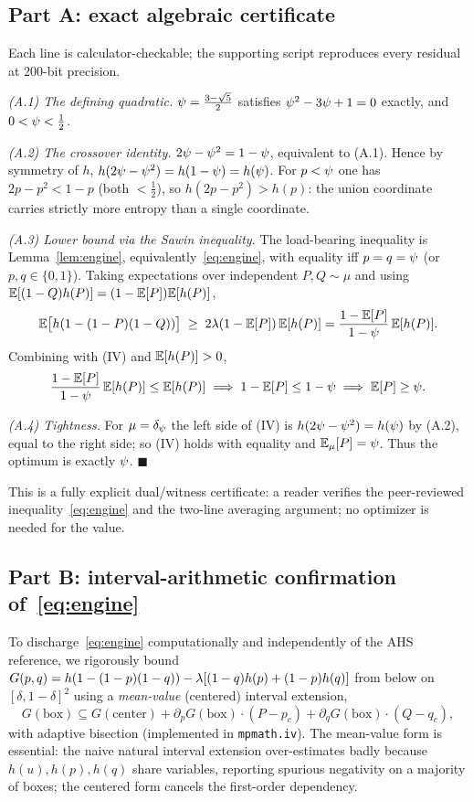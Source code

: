 \documentclass[11pt]{amsart}
\theoremstyle{definition}
\theoremstyle{remark}
\begin{document}
\subsection{Part A: exact algebraic certificate}
Each line is calculator-checkable; the supporting script reproduces every residual
at $200$-bit precision.

\emph{(A.1) The defining quadratic.} $\psi=\tfrac{3-\sqrt{5}}{2}$ satisfies
$\psi^2-3\psi+1=0$ exactly, and $0<\psi<\tfrac12$.

\emph{(A.2) The crossover identity.} $2\psi-\psi^2=1-\psi$, equivalent to
(A.1). Hence by symmetry of $h$,
$h(2\psi-\psi^2)=h(1-\psi)=h(\psi)$. For $p<\psi$ one has
$2p-p^2<1-p$ (both $<\tfrac12$), so $h(2p-p^2)>h(p)$: the union coordinate
carries strictly more entropy than a single coordinate.

\emph{(A.3) Lower bound via the Sawin inequality.} The load-bearing inequality is
Lemma~\ref{lem:engine}, equivalently~\eqref{eq:engine}, with equality iff
$p=q=\psi$ (or $p,q\in\{0,1\}$). Taking expectations over independent
$P,Q\sim\mu$ and using $\mathbb{E}[(1-Q)h(P)]=(1-\mathbb{E}[P])\mathbb{E}[h(P)]$,
\[
   \mathbb{E}\bigl[h(1-(1-P)(1-Q))\bigr]\;\ge\;2\lambda(1-\mathbb{E}[P])\,\mathbb{E}[h(P)]
   =\frac{1-\mathbb{E}[P]}{1-\psi}\,\mathbb{E}[h(P)] .
\]
Combining with (IV) and $\mathbb{E}[h(P)]>0$,
\[
   \frac{1-\mathbb{E}[P]}{1-\psi}\,\mathbb{E}[h(P)]\le\mathbb{E}[h(P)]
   \;\Longrightarrow\; 1-\mathbb{E}[P]\le 1-\psi
   \;\Longrightarrow\; \mathbb{E}[P]\ge\psi .
\]

\emph{(A.4) Tightness.} For $\mu=\delta_{\psi}$ the left side of (IV) is
$h(2\psi-\psi^2)=h(\psi)$ by (A.2), equal to the right side; so (IV) holds with
equality and $\mathbb{E}_\mu[P]=\psi$. Thus the optimum is exactly $\psi$.\qquad
$\blacksquare$

This is a fully explicit dual/witness certificate: a reader verifies the
peer-reviewed inequality~\eqref{eq:engine} and the two-line averaging argument; no
optimizer is needed for the value.

\subsection{Part B: interval-arithmetic confirmation of~\eqref{eq:engine}}
To discharge~\eqref{eq:engine} computationally and independently of the AHS
reference, we rigorously bound $G(p,q)=h(1-(1-p)(1-q))-\lambda[(1-q)h(p)+(1-p)h(q)]$
from below on $[\delta,1-\delta]^2$ using a \emph{mean-value} (centered) interval
extension,
\[
   G(\mathrm{box})\subseteq G(\text{center})
   +\partial_pG(\mathrm{box})\cdot(P-p_c)+\partial_qG(\mathrm{box})\cdot(Q-q_c),
\]
with adaptive bisection (implemented in \texttt{mpmath.iv}). The mean-value form
is essential: the naive natural interval extension over-estimates badly because
$h(u),h(p),h(q)$ share variables, reporting spurious negativity on a majority of
boxes; the centered form cancels the first-order dependency.
\end{document}
